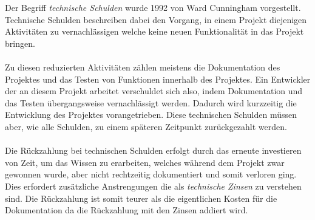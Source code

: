 \documentclass[a4paper,12pt]{scrartcl}
\begin{document}
Der Begriff \textit{technische Schulden} wurde 1992 von Ward Cunningham vorgestellt. Technische Schulden beschreiben dabei den Vorgang, in einem Projekt diejenigen Aktivitäten zu vernachlässigen welche keine neuen Funktionalität in das Projekt bringen. 
\\\\
Zu diesen reduzierten Aktivitäten zählen meistens die Dokumentation des Projektes und das Testen von Funktionen innerhalb des Projektes. Ein Entwickler der an diesem Projekt arbeitet verschuldet sich also, indem Dokumentation und das Testen übergangsweise vernachlässigt werden. Dadurch wird kurzzeitig die Entwicklung des Projektes vorangetrieben. Diese technischen Schulden müssen aber, wie alle Schulden, zu einem späteren Zeitpunkt zurückgezahlt werden. 
\\\\
Die Rückzahlung bei technischen Schulden erfolgt durch das erneute investieren von Zeit, um das Wissen zu erarbeiten, welches während dem Projekt zwar gewonnen wurde, aber nicht rechtzeitig dokumentiert und somit verloren ging. Dies erfordert zusätzliche Anstrengungen die als \textit{technische Zinsen} zu verstehen sind. Die Rückzahlung ist somit teurer als die eigentlichen Kosten für die Dokumentation da die Rückzahlung mit den Zinsen addiert wird.
\end{document}
